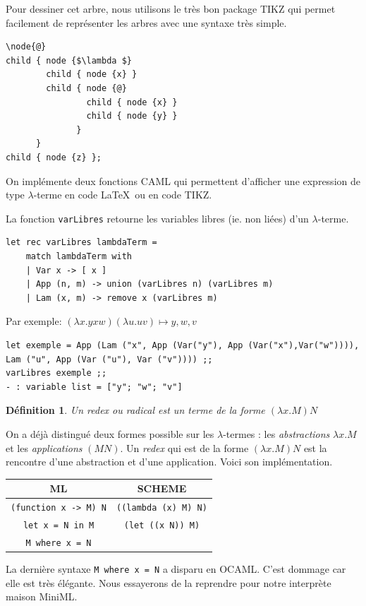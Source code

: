 \documentclass[11pt]{book}
\newtheorem{definition}{Définition}
\begin{document}
Pour dessiner cet arbre, nous utilisons le tr\`{e}s bon package TIKZ qui permet facilement de repr\'{e}senter
les arbres avec une syntaxe très simple.
\begin{Verbatim}
\node{@}
child { node {$\lambda $}
		child { node {x} }
		child { node {@}
				child { node {x} }
				child { node {y} }
			  }
	  }
child { node {z} };
\end{Verbatim}

On impl\'{e}mente deux fonctions CAML
qui permettent  d'afficher une expression de type $\lambda $-terme en code \LaTeX\ ou en code TIKZ.



La fonction \verb+varLibres+ retourne les variables libres (ie. non li\'{e}es) d'un $\lambda $-terme.
\begin{Verbatim}
let rec varLibres lambdaTerm =
	match lambdaTerm with
	| Var x -> [ x ]
	| App (n, m) -> union (varLibres n) (varLibres m)
	| Lam (x, m) -> remove x (varLibres m)
\end{Verbatim}


Par exemple: $(\lambda x.yxw)(\lambda u.uv) \longmapsto  y,w,v $

\begin{Verbatim}
let exemple = App (Lam ("x", App (Var("y"), App (Var("x"),Var("w")))),
Lam ("u", App (Var ("u"), Var ("v")))) ;;
varLibres exemple ;;
- : variable list = ["y"; "w"; "v"]
\end{Verbatim}


\begin{definition}
Un redex ou radical est un terme de la forme $(\lambda x.M)N$
\end{definition}
On a déjà distingué deux formes possible sur les $\lambda$-termes : les \textit{abstractions} $\lambda x.M$ et les
\textit{applications} $(M N)$. Un \textit{redex} qui est de la forme $(\lambda x.M)N$ est la
rencontre d'une abstraction et d'une application. Voici son implémentation.


\vspace{0.5cm}
\begin{center}
\begin{tabular}{c | c} \hline
ML & SCHEME \\ \hline
\texttt{(function x -> M) N} &  \texttt{((lambda (x) M) N)} \\ 
\texttt{let x = N in M} & \texttt{(let ((x N)) M)} \\ 
\texttt{M where x = N} &  \\ 
\end{tabular}
\end{center}
La dernière syntaxe \texttt{M where x = N} a disparu en OCAML. C'est dommage car elle est très élégante.
Nous essayerons de la reprendre pour notre interprète maison MiniML.
\end{document}
